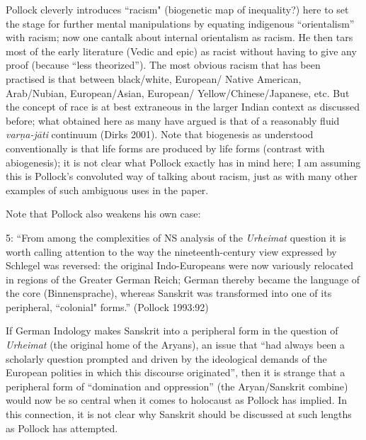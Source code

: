 {\begin{enumerate}
Pollock cleverly introduces “racism" (biogenetic map of inequality?) here to set the stage for further mental manipulations by equating indigenous “orientalism” with racism; now one can\break talk about internal orientalism as racism. He then tars most of the early literature (Vedic and epic) as racist without having to give any proof (because “less theorized”). The most obvious racism that has been practised is that between black/white, European/ Native American, Arab/Nubian, European/Asian, European/ Yellow/Chinese/Japanese, etc. But the concept of race is at best extraneous in the larger Indian context as discussed before; what obtained here as many have argued is that of a reasonably fluid {\sl varṇa-jāti} continuum (Dirks 2001). Note that biogenesis as understood conventionally is that life forms are  produced by life forms (contrast with abiogenesis); it is not clear what Pollock exactly has in mind here; I am assuming this is Pollock’s convoluted way of talking about racism, just as with many other examples of such ambiguous uses in the paper.

Note that Pollock also weakens his own case:
\begin{myquote}
5: “From among the complexities of NS analysis of the {\sl Urheimat} question it is worth calling attention to the way the nineteenth-century view expressed by Schlegel was reversed: the original Indo-Europeans were now variously relocated in regions of the Greater German Reich; German thereby became the language of the core (Binnensprache), whereas Sanskrit was transformed into one of its peripheral, ``colonial" forms.” \hfill 	(Pollock 1993:92)
\end{myquote}
\medskip

If German Indology makes Sanskrit into a peripheral form in the question of {\sl Urheimat} (the original home of the Aryans), an issue that “had always been a scholarly question prompted and driven by the ideological demands of the European polities in which this discourse originated”, then it is strange that a peripheral form of “domination and oppression” (the Aryan/Sanskrit combine) would now be so central when it comes to holocaust as Pollock has implied. In this connection, it is not clear why Sanskrit should be discussed at such lengths as Pollock has attempted.


\end{enumerate}}
